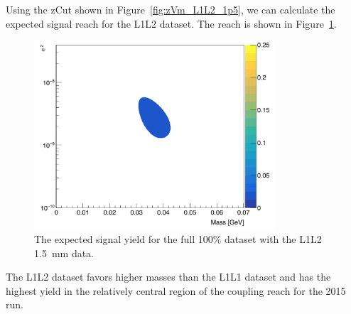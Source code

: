 Using the zCut shown in Figure~\ref{fig:zVm_L1L2_1p5}, we can calculate the expected signal reach for the L1L2 dataset. The reach is shown in Figure~\ref{fig:reach1p5_l1l2}.

\begin{figure}[H]
  \centering
     \includegraphics[width=0.8\textwidth]{plots/reachL1L2_1p5.png}
  \caption{The expected signal yield for the full 100$\%$ dataset with the L1L2 1.5~mm data.}
  \label{fig:reach1p5_l1l2}
\end{figure} 

The L1L2 dataset favors higher masses than the L1L1 dataset and has the highest yield in the relatively central region of the coupling reach for the 2015 run. 
